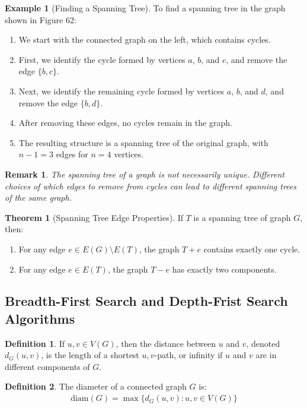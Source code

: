 \documentclass{article}
\newtheorem{remark}{Remark}
\theoremstyle{definition}
\newtheorem{example}{Example}
\newtheorem{theorem}{Theorem}
\newtheorem{definition}{Definition}
\begin{document}
\begin{example}[Finding a Spanning Tree]
To find a spanning tree in the graph shown in Figure 62:
\begin{enumerate}
    \item We start with the connected graph on the left, which contains cycles.
    \item First, we identify the cycle formed by vertices $a$, $b$, and $c$, and remove the edge $\{b,c\}$.
    \item Next, we identify the remaining cycle formed by vertices $a$, $b$, and $d$, and remove the edge $\{b,d\}$.
    \item After removing these edges, no cycles remain in the graph.
    \item The resulting structure is a spanning tree of the original graph, with $n-1 = 3$ edges for $n = 4$ vertices.
\end{enumerate}
\end{example}

\begin{remark}
The spanning tree of a graph is not necessarily unique. Different choices of which edges to remove from cycles can lead to different spanning trees of the same graph.
\end{remark}

\begin{theorem}[Spanning Tree Edge Properties]
If $T$ is a spanning tree of graph $G$, then:
\begin{enumerate}
    \item For any edge $e \in E(G) \setminus E(T)$, the graph $T + e$ contains exactly one cycle.
    \item For any edge $e \in E(T)$, the graph $T - e$ has exactly two components.
\end{enumerate}
\end{theorem}

\subsection{Breadth-First Search and Depth-Frist Search Algorithms}

\begin{definition}
If $u, v \in V(G)$, then the distance between $u$ and $v$, denoted $d_G(u,v)$, is the length of a shortest $u,v$-path, or infinity if $u$ and $v$ are in different components of $G$.
\end{definition}

\begin{definition}
The diameter of a connected graph $G$ is:
\begin{align*}
\text{diam}(G) = \max\{d_G(u,v) : u,v \in V(G)\}
\end{align*}
\end{definition}
\end{document}
